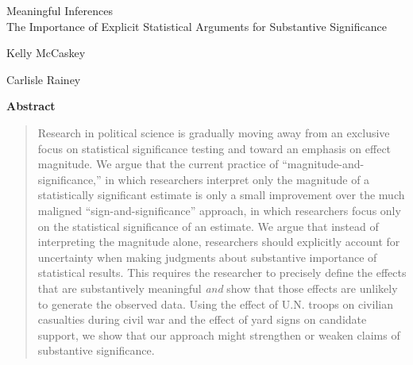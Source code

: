 \documentclass[12pt]{article}
\begin{document}
\begin{center}
{\LARGE Meaningful Inferences}\\\vspace{2mm}
{\large The Importance of Explicit Statistical Arguments for Substantive Significance}\\\vspace{2mm}


\vspace{10mm}

Kelly McCaskey

\vspace{3mm}

Carlisle Rainey
\end{center}

\vspace{10mm}

{\centerline{\textbf{Abstract}}}
\begin{quote}\noindent
Research in political science is gradually moving away from an exclusive focus on statistical significance testing and toward an emphasis on effect magnitude. We argue that the current practice of ``magnitude-and-significance,'' in which researchers interpret only the magnitude of a statistically significant estimate is only a small improvement over the much maligned ``sign-and-significance'' approach, in which researchers focus only on the statistical significance of an estimate. We argue that instead of interpreting the magnitude alone, researchers should explicitly account for uncertainty when making judgments about substantive importance of statistical results. This requires the researcher to precisely define the effects that are substantively meaningful \emph{and} show that those effects are unlikely to generate the observed data. Using the effect of U.N. troops on civilian casualties during civil war and the effect of yard signs on candidate support, we show that our approach might strengthen or weaken claims of substantive significance. 
 \end{quote}
\end{document}

